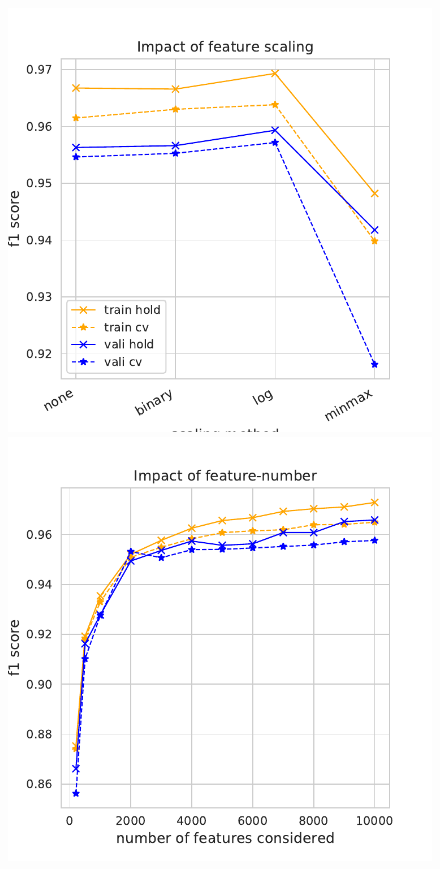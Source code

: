 \documentclass[11pt]{article}
\begin{document}
\begin{figure}
\begin{minipage}[l]{0.3\textwidth}
\includegraphics[width=1\linewidth]{email_spam/nb_scaling.pdf}
\end{minipage}
\begin{minipage}[l]{0.3\textwidth}
\includegraphics[width=1\linewidth]{email_spam/nb_features.pdf}

\end{minipage}
\end{figure}
\end{document}
